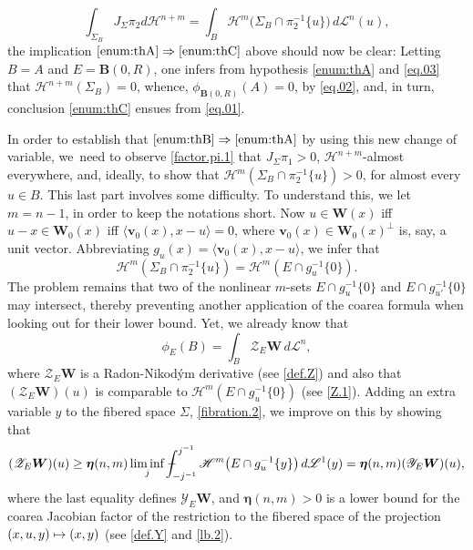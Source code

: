 \documentclass[11pt]{article}
\theoremstyle{definition}
\theoremstyle{jepanonymous}
\theoremstyle{plain}
\newcommand\mto{\mathchoice{\longmapsto}{\mapsto}{\mapsto}{\mapsto}}
\newcommand{\calH}{\mathscr{H}}
\newcommand{\calL}{\mathscr{L}}
\newcommand{\calY}{\mathscr{Y}}
\newcommand{\calZ}{\mathscr{Z}}
\newcommand{\boldeta}{\boldsymbol{\eta}}
\newcommand{\bB}{{\boldsymbol{B}}}
\newcommand{\bW}{{\boldsymbol{W}}}
\newcommand{\bv}{{\boldsymbol{v}}}
\def\Xint#1{\mathchoice
{\XXint\displaystyle\textstyle{#1}}{\XXint\textstyle\scriptstyle{#1}}{\XXint\scriptstyle\scriptscriptstyle{#1}}{\XXint\scriptscriptstyle
\scriptscriptstyle{#1}}\!\int}
\def\XXint#1#2#3{{\setbox0=\hbox{$#1{#2#3}{\int}$}
\vcenter{\hbox{$#2#3$}}\kern-.5\wd0}}
\def\dashint{\Xint-}
\let\la\langle
\let\ra\rangle
\begin{document}
\begin{equation}
\label{eq.03}
\int_{\Sigma_B} J_\Sigma \pi_2 d \calH^{n+m} = \int_B \calH^m \bigl(\Sigma_B \cap \pi_2^{-1}\{u\}\bigr)\,d\calL^n(u),
\end{equation}
the implication $\eqref{enum:thA} \Rightarrow \eqref{enum:thC}$ above should now be clear: Letting $B=A$ and $E=\bB(0,R)$, one infers from hypothesis \eqref{enum:thA} and \eqref{eq.03} that $\calH^{n+m}(\Sigma_B) = 0$, whence, $\phi_{\bB(0,R)}(A)=0$, by \eqref{eq.02}, and, in turn, conclusion \eqref{enum:thC} ensues from \eqref{eq.01}.
\par
In order to establish that $\eqref{enum:thB} \Rightarrow \eqref{enum:thA}$ by using this new change of variable, we~need to observe \ref{factor.pi.1} that $J_\Sigma \pi_1 > 0$, $\calH^{n+m}$-almost everywhere, and, ideally, to show that $\calH^m \left(\Sigma_B \cap \pi_2^{-1}\{u\}\right) > 0$, for almost every $u \in B$.
This last part involves some difficulty.
To understand this, we let $m=n-1$, in order to keep the notations short.
Now $u \in \bW(x)$ iff $u-x \in \bW_0(x)$ iff $\la \bv_0(x), x-u \ra =0$, where $\bv_0(x) \in \bW_0(x)^\perp$ is, say, a unit vector.
Abbreviating $g_u(x) = \la \bv_0(x), x-u \ra$, we infer that
\begin{equation*}
\calH^m(\Sigma_B \cap \pi_2^{-1}\{u\}) = \calH^m(E \cap g_u^{-1} \{0\}).
\end{equation*}
The problem remains that two of the nonlinear $m$-sets $E \cap g_u^{-1} \{0\}$ and $E \cap g_{u'}^{-1} \{0\}$ may intersect, thereby preventing another application of the coarea formula when looking out for their lower bound.
Yet, we already know that
\begin{equation*}
\phi_E(B) = \int_B \calZ_E \bW \,d\calL^n,
\end{equation*}
where $\calZ_E \bW$ is a Radon-Nikod\'ym derivative (see \ref{def.Z}) and also that $(\calZ_E \bW)(u)$ is comparable to $\calH^m \left(E \cap g_u^{-1} \{0\}\right)$ (see \ref{Z.1}).
Adding an extra variable $y$ to the fibered space $\Sigma$, \ref{fibration.2}, we improve on this by showing that
\begin{equation*}
(\calZ_E \bW)(u) \geq \boldeta(n,m) \liminf_j \dashint_{-j^{-1}}^{j^{-1}} \calH^m \bigl(E \cap g_u^{-1} \{y\}\bigr) \,d\calL^1(y) = \boldeta(n,m) (\calY_E \bW)(u),
\end{equation*}
where the last equality defines $\calY_E \bW$, and $\boldeta(n,m) > 0$ is a lower bound for the coarea Jacobian factor of the restriction to the fibered space of the projection $(x,u,y) \mto (x,y)$ (see \ref{def.Y} and \ref{lb.2}).
\end{document}
